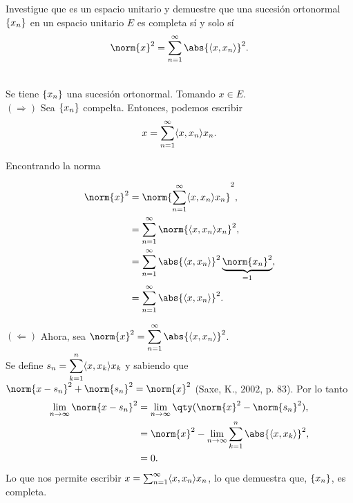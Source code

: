 \vspace{1cm}
\begin{tcolorbox}[arc=0mm,boxrule=0pt,colframe=white,colback=lightgray!25]
	Investigue que es un espacio unitario y demuestre que una sucesión ortonormal $\{ x_{n} \}$ en un espacio unitario $E$ es completa sí y solo sí 
		$$ \norm{x}^2 = \sum _{n = 1} ^\infty \abs{\inner{x}{x_n}} ^2. $$
\end{tcolorbox}

 \\
	Se tiene $\{ x_{n} \}$ una sucesión ortonormal. Tomando $x\in E$. \\
	
	$(\Rightarrow)$ Sea $\{ x_{n} \}$ compelta. Entonces, podemos escribir
		$$ x = \sum _{n = 1} ^\infty \langle x , x_n \rangle x_n . $$
	\begin{center}
		Encontrando la norma
	\end{center}
		\begin{align*}
			\norm{x} ^2 &= \norm{\sum _{n = 1} ^\infty \inner{x}{x_n} x_n} ^2, \\
			&= \sum _{n = 1} ^\infty \norm{\inner{x}{x_n} x_n} ^2, \\
			&= \sum _{n = 1} ^\infty \abs{\inner{x}{x_n}}^2 \underbrace{\norm{x_n}^2}_{=1} , \\
			&= \sum _{n = 1} ^\infty \abs{\inner{x}{x_n}}^2 .
		\end{align*}
		
	$(\Leftarrow)$ Ahora, sea $\norm{x}^2 = \displaystyle\sum _{n = 1} ^\infty \abs{\inner{x}{x_n}}^2$. \\ Se define $s_n = \displaystyle\sum _{k = 1} ^n \langle x , x_k \rangle x_k$ y sabiendo que $\norm{x - s_n}^2 + \norm{s_n}^2 = \norm{x}^2$ (Saxe, K., $2002$, p. $83$). Por lo tanto
		\begin{align*}
			\lim _{n \to \infty} \norm{x - s_n} ^2 &= \lim _{n\to \infty} \qty(\norm{x}^2 - \norm{s_n}^2), \\
			&= \norm{x}^2 - \lim _{n\to \infty} \sum _{k = 1} ^n \abs{\inner{x}{x_k}}^2 , \\
			&= 0.
		\end{align*}
	Lo que nos permite escribir $x = \sum _{n = 1} ^\infty \langle x , x_n \rangle x_n$, lo que demuestra que, $\{ x_{n} \}$, es completa.










